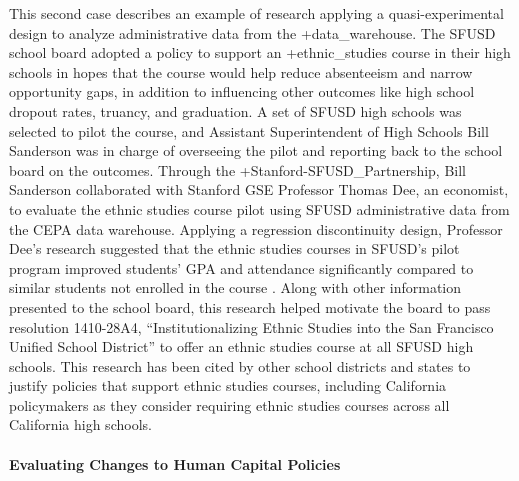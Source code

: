 \documentclass[
]{WileySix}
\begin{document}
This second case describes an example of research applying a quasi-experimental design to analyze administrative data from the +data\_warehouse\textbar. The SFUSD school board adopted a policy to support an +ethnic\_studies\textbar{} course in their high schools in hopes that the course would help reduce absenteeism and narrow opportunity gaps, in addition to influencing other outcomes like high school dropout rates, truancy, and graduation. A set of SFUSD high schools was selected to pilot the course, and Assistant Superintendent of High Schools Bill Sanderson was in charge of overseeing the pilot and reporting back to the school board on the outcomes. Through the +Stanford-SFUSD\_Partnership\textbar, Bill Sanderson collaborated with Stanford GSE Professor Thomas Dee, an economist, to evaluate the ethnic studies course pilot using SFUSD administrative data from the CEPA data warehouse. Applying a regression discontinuity design, Professor Dee's research suggested that the ethnic studies courses in SFUSD's pilot program improved students' GPA and attendance significantly compared to similar students not enrolled in the course \citep{dee2017}. Along with other information presented to the school board, this research helped motivate the board to pass resolution 1410-28A4, ``Institutionalizing Ethnic Studies into the San Francisco Unified School District'' \citep{sanfranciscounifiedschooldistrict2014} to offer an ethnic studies course at all SFUSD high schools. This research has been cited by other school districts \citep{cuevas2019} and states \citep{ragland2017} to justify policies that support ethnic studies courses, including California policymakers as they consider requiring ethnic studies courses across all California high schools.

\hypertarget{evaluating-changes-to-human-capital-policies}{%
\paragraph{Evaluating Changes to Human Capital Policies}\label{evaluating-changes-to-human-capital-policies}}
\end{document}
